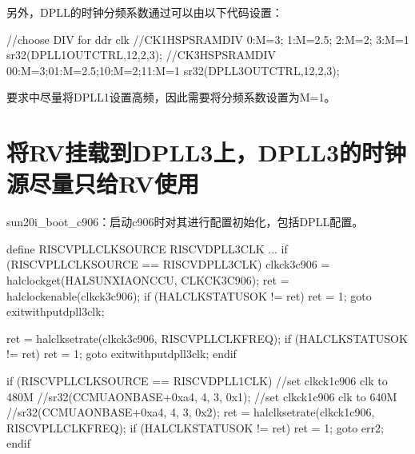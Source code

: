 \documentclass[letterpaper,10pt,english]{sphinxmanual}
\begin{document}
\sphinxAtStartPar
另外，DPLL的时钟分频系数通过可以由以下代码设置：

\begin{sphinxVerbatim}[commandchars=\\\{\}]
//choose DIV for ddr clk
//CK1\PYGZus{}HSPSRAM\PYGZus{}DIV 0:M=3; 1:M=2.5; 2:M=2; 3:M=1
sr32(DPLL1\PYGZus{}OUT\PYGZus{}CTRL,12,2,3);
//CK3\PYGZus{}HSPSRAM\PYGZus{}DIV 00:M=3;01:M=2.5;10:M=2;11:M=1
sr32(DPLL3\PYGZus{}OUT\PYGZus{}CTRL,12,2,3);
\end{sphinxVerbatim}

\sphinxAtStartPar
要求中尽量将DPLL1设置高频，因此需要将分频系数设置为M=1。


\section{将RV挂载到DPLL3上，DPLL3的时钟源尽量只给RV使用}
\label{\detokenize{r128_u9a8c_u8bc1_u56fa_u4ef6/r128_u9a8c_u8bc1_u56fa_u4ef6_u5f00_u53d1_u6307_u5357:rvdpll3-dpll3rv}}
\sphinxAtStartPar
{}

\sphinxAtStartPar
{}

\sphinxAtStartPar
{}

\sphinxAtStartPar
sun20i\_boot\_c906：启动c906时对其进行配置初始化，包括DPLL配置。

\sphinxAtStartPar
{}

\begin{sphinxVerbatim}[commandchars=\\\{\}]
\PYGZsh{}define RISCV\PYGZus{}PLL\PYGZus{}CLK\PYGZus{}SOURCE RISCV\PYGZus{}DPLL3\PYGZus{}CLK
...
\PYGZsh{}if (RISCV\PYGZus{}PLL\PYGZus{}CLK\PYGZus{}SOURCE == RISCV\PYGZus{}DPLL3\PYGZus{}CLK)
    clk\PYGZus{}ck3\PYGZus{}c906 = hal\PYGZus{}clock\PYGZus{}get(HAL\PYGZus{}SUNXI\PYGZus{}AON\PYGZus{}CCU, CLK\PYGZus{}CK3\PYGZus{}C906);
    ret = hal\PYGZus{}clock\PYGZus{}enable(clk\PYGZus{}ck3\PYGZus{}c906);
    if (HAL\PYGZus{}CLK\PYGZus{}STATUS\PYGZus{}OK != ret) \PYGZob{}
        ret = \PYGZhy{}1;
        goto exit\PYGZus{}with\PYGZus{}put\PYGZus{}dpll3\PYGZus{}clk;
    \PYGZcb{}

    ret = hal\PYGZus{}clk\PYGZus{}set\PYGZus{}rate(clk\PYGZus{}ck3\PYGZus{}c906, RISCV\PYGZus{}PLL\PYGZus{}CLK\PYGZus{}FREQ);
    if (HAL\PYGZus{}CLK\PYGZus{}STATUS\PYGZus{}OK != ret) \PYGZob{}
        ret = \PYGZhy{}1;
        goto exit\PYGZus{}with\PYGZus{}put\PYGZus{}dpll3\PYGZus{}clk;
    \PYGZcb{}
\PYGZsh{}endif

\PYGZsh{}if (RISCV\PYGZus{}PLL\PYGZus{}CLK\PYGZus{}SOURCE == RISCV\PYGZus{}DPLL1\PYGZus{}CLK)
    //set clk\PYGZus{}ck1\PYGZus{}c906 clk to 480M
    //sr32(CCMU\PYGZus{}AON\PYGZus{}BASE+0xa4,  4, 3, 0x1);
    //set clk\PYGZus{}ck1\PYGZus{}c906 clk to 640M
    //sr32(CCMU\PYGZus{}AON\PYGZus{}BASE+0xa4,  4, 3, 0x2);
    ret = hal\PYGZus{}clk\PYGZus{}set\PYGZus{}rate(clk\PYGZus{}ck1\PYGZus{}c906, RISCV\PYGZus{}PLL\PYGZus{}CLK\PYGZus{}FREQ);
    if (HAL\PYGZus{}CLK\PYGZus{}STATUS\PYGZus{}OK != ret) \PYGZob{}
        ret = \PYGZhy{}1;
        goto err2;
    \PYGZcb{}
\PYGZsh{}endif
\end{sphinxVerbatim}
\end{document}
